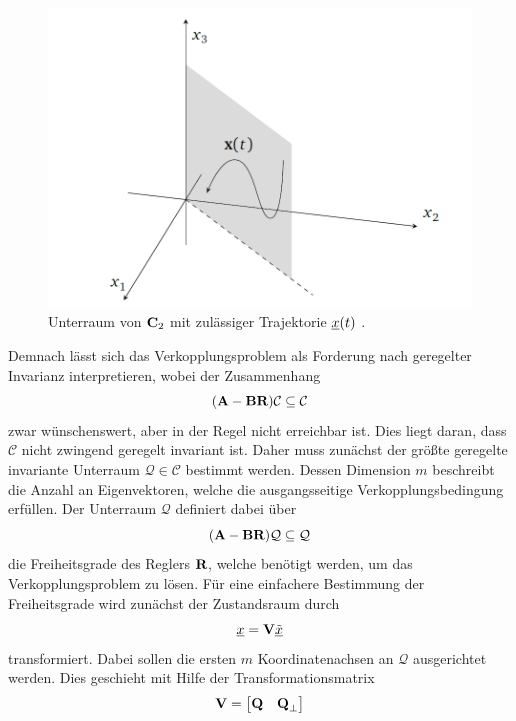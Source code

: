 \begin{figure}[h]
	\centering
	\includegraphics[width=\textwidth]{./Bilder/UnterraumTraj.png}
	\caption{Unterraum von $\textbf{C}_{2}$ mit zulässiger Trajektorie $\underline{x}(t)$ \cite{Schaub}.}
	\label{fig:UnterRTraj}
\end{figure}
Demnach lässt sich das Verkopplungsproblem als Forderung nach geregelter Invarianz interpretieren, wobei der Zusammenhang
\begin{equation}
	(\textbf{A}-\textbf{B}\textbf{R})\mathcal{C} \subseteq \mathcal{C}  
\end{equation}
zwar wünschenswert, aber in der Regel nicht erreichbar ist. Dies liegt daran, dass $\mathcal{C}$ nicht zwingend geregelt invariant ist. Daher muss zunächst der größte geregelte invariante Unterraum $\mathcal{Q} \in \mathcal{C}$ bestimmt werden. Dessen Dimension $m$ beschreibt die Anzahl an Eigenvektoren, welche die ausgangsseitige Verkopplungsbedingung erfüllen. 
Der Unterraum $\mathcal{Q}$ definiert dabei über 
\begin{equation}
	(\textbf{A} - \textbf{B}\textbf{R}) \mathcal{Q} \subseteq \mathcal{Q}
\end{equation}
die Freiheitsgrade des Reglers $\textbf{R}$, welche benötigt werden, um das Verkopplungsproblem zu lösen. Für eine einfachere Bestimmung der Freiheitsgrade wird zunächst der Zustandsraum durch
\begin{equation}
	\underline{x} = \textbf{V}\underline{\tilde{x}}
\end{equation}
transformiert.
Dabei sollen die ersten $m$ Koordinatenachsen an $\mathcal{Q}$ ausgerichtet werden.
Dies geschieht mit Hilfe der Transformationsmatrix 
\begin{equation}
\textbf{V} =\begin{bmatrix} \textbf{Q}	&\textbf{Q}_{\bot} \end{bmatrix}
\end{equation}
